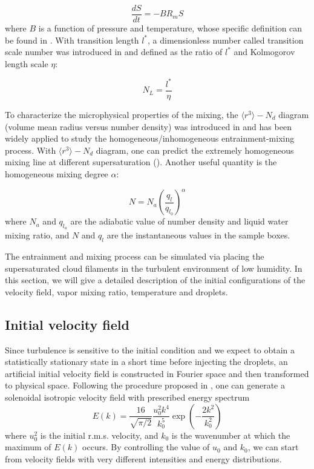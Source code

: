 \documentclass[12pt]{article}
\begin{document}
\begin{equation}
\frac{dS}{dt}=-BR_{m}S\label{eq:DiffSuper}
\end{equation}
where $B$ is a function of pressure and temperature, whose specific definition can be found in \cite{Chunsong11}. With transition length $l^{*}$, a dimensionless number called transition scale number was introduced in \cite{Chunsong13} and defined as the ratio of $l^{*}$ and Kolmogorov length scale $\eta$:

\begin{equation}
N_{L}=\frac{l^{*}}{\eta}\label{eq:NL}
\end{equation}

To characterize the microphysical properties of the mixing, the $\langle r^3\rangle -N_d$ diagram (volume mean radius versus number density) was introduced in \cite{Burnet07} and has been widely applied to study the homogeneous/inhomogeneous entrainment-mixing process. With $\langle r^3\rangle -N_d$ diagram, one can predict the extremely homogeneous mixing line at different supersaturation (\cite{Lehmann09,Kumar14}). Another useful quantity is the homogeneous mixing degree $\alpha$:

\begin{equation}
N=N_{a}(\frac{q_l}{q_{l_0}})^{\alpha}\label{eq:alpha}
\end{equation}
where $N_{a}$ and $q_{l_a}$ are the adiabatic value of number density and liquid water mixing ratio, and $N$ and $q_{l}$ are the instantaneous values in the sample boxes.

The entrainment and mixing process can be simulated via placing the supersaturated cloud filaments in the turbulent environment of low humidity. In this section, we will give a detailed description of the initial configurations of the velocity field, vapor mixing ratio, temperature and droplets. 

\subsection{Initial velocity field}

Since turbulence is sensitive to the initial condition and we expect
to obtain a statistically stationary state in a short time before injecting the droplets, an artificial initial velocity field is constructed in Fourier space and then transformed to physical space. Following the procedure proposed in \cite{Rogallo81}, one can generate a solenoidal isotropic velocity field with prescribed energy spectrum \cite{Rosales05}
\begin{equation}
E(k) = \frac{16}{\sqrt{\pi/2}}\frac{u_0^2k^4}{k_0^5}\exp(-\frac{2k^2}{k_0^2})
\end{equation}
where $u_0^2$ is the initial r.m.s. velocity, and $k_0$ is the wavenumber at which the maximum of $E(k)$ occurs. By controlling the value of $u_0$ and $k_0$, we can start from velocity fields with very different intensities and energy distributions.
\end{document}

